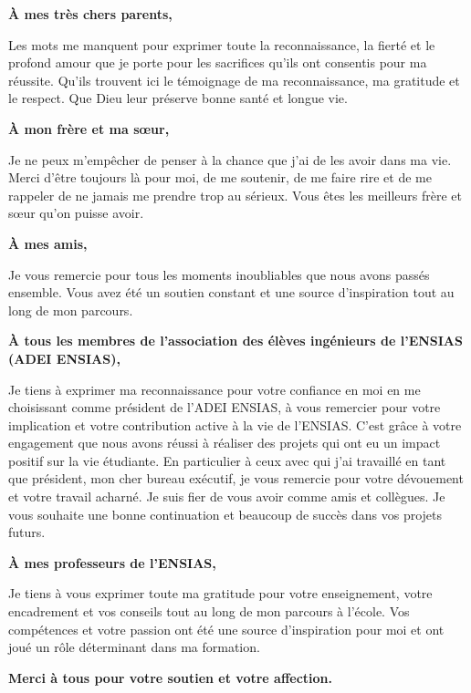 \begin{center}

    \textbf{\large À mes très chers parents,}

    Les mots me manquent pour exprimer toute la reconnaissance, la fierté et le profond amour que je porte pour les sacrifices qu'ils ont consentis pour ma réussite. Qu'ils trouvent ici le témoignage de ma reconnaissance, ma gratitude et le respect. Que Dieu leur préserve bonne santé et longue vie.

    \vspace{5mm}

    \textbf{\large À mon frère et ma sœur,}

    Je ne peux m'empêcher de penser à la chance que j'ai de les avoir dans ma vie. Merci d'être toujours là pour moi, de me soutenir, de me faire rire et de me rappeler de ne jamais me prendre trop au sérieux. Vous êtes les meilleurs frère et sœur qu'on puisse avoir.

    \vspace{5mm}

    \textbf{\large À mes amis,}

    Je vous remercie pour tous les moments inoubliables que nous avons passés ensemble. Vous avez été un soutien constant et une source d'inspiration tout au long de mon parcours.

    \vspace{5mm}

    \textbf{\large À tous les membres de l'association des élèves ingénieurs de l'ENSIAS (ADEI ENSIAS),}

    Je tiens à exprimer ma reconnaissance pour votre confiance en moi en me choisissant comme président de l'ADEI ENSIAS, à vous remercier pour votre implication et votre contribution active à la vie de l'ENSIAS. C'est grâce à votre engagement que nous avons réussi à réaliser des projets qui ont eu un impact positif sur la vie étudiante. En particulier à ceux avec qui j'ai travaillé en tant que président, mon cher bureau exécutif, je vous remercie pour votre dévouement et votre travail acharné. Je suis fier de vous avoir comme amis et collègues. Je vous souhaite une bonne continuation et beaucoup de succès dans vos projets futurs.

    \vspace{5mm}

    \textbf{\large À mes professeurs de l'ENSIAS,}

    Je tiens à vous exprimer toute ma gratitude pour votre enseignement, votre encadrement et vos conseils tout au long de mon parcours à l'école. Vos compétences et votre passion ont été une source d'inspiration pour moi et ont joué un rôle déterminant dans ma formation.

    \vspace{10mm}

    \textbf{\large Merci à tous pour votre soutien et votre affection.}

\end{center}